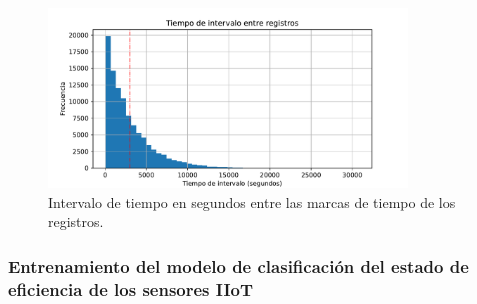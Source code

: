 \begin{figure}[ht!]
    \centering
    \includegraphics[width=0.85\textwidth]{fig/08_datadriven/datadriven_04.pdf}
    \caption{Intervalo de tiempo en segundos entre las marcas de tiempo de los registros.}
    \label{fig:interval_time}
\end{figure}

\subsubsection{Entrenamiento del modelo de clasificación del estado de eficiencia de los sensores IIoT}
\label{subsubsec:model}

